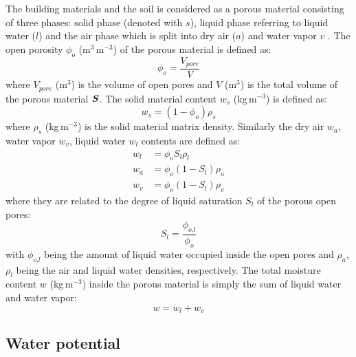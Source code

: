 The building materials and the soil is considered as a porous material consisting of three phases: solid phase (denoted with $s$), liquid phase referring to liquid water ($l$) and the air phase which is split into dry air ($a$) and water vapor $v$ \citep{Defraeye2011, Saneinejad2013, Carmeliet2005,Janssen2002}. The open porosity $\phi_o$ (m$^3$\,m$^{-3}$) of the porous material is defined as:
\begin{equation}
\phi_o = \frac{V_{\mathit{pore}}}{V}
\end{equation}
where $V_{\textit{pore}}$ (m$^3$) is the volume of open pores and $V$ (m$^3$) is the total volume of the porous material $\textbf{\textit{S}}$. The solid material content $w_s$ (kg\,m$^{-3}$) is defined as:
\begin{equation}
w_s = \left(1 - \phi_o \right) \rho_s
\end{equation}
where $\rho_s$ (kg\,m$^{-3}$) is the solid material matrix density. Similarly the dry air $w_a$, water vapor $w_v$, liquid water $w_l$ contents are defined as:
\begin{align}
w_l &= \phi_o S_l \rho_l \\
w_a &= \phi_o \left( 1 - S_l \right) \rho_a \\
w_v &= \phi_o \left( 1 - S_l \right) \rho_v
\end{align}
where they are related to the degree of liquid saturation $S_l$ of the porous open pores:
\begin{equation}
S_l = \frac{\phi_{\textit{o,l}}}{\phi_o}
\end{equation}
with $\phi_{\textit{o,l}}$ being the amount of liquid water occupied inside the open pores and $\rho_a$, $\rho_l$ being the air and liquid water densities, respectively. The total moisture content $w$ (kg\,m$^{-3}$) inside the porous material is simply the sum of liquid water and water vapor:
\begin{equation}
w = w_l + w_v
\end{equation}

\subsection{Water potential}

